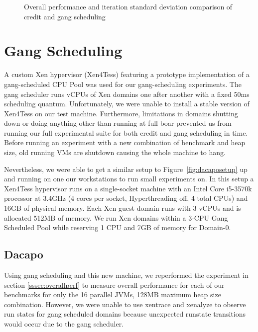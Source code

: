 \documentclass{sig-alternate}
\begin{document}

\begin{figure*}
\centering
{}
\caption{Overall performance and iteration standard deviation comparison of credit and gang scheduling}
\label{fig:gsresults}
\end{figure*}

\section{Gang Scheduling}
A custom Xen hypervisor (Xen4Tess) featuring a prototype implementation of a gang-scheduled CPU Pool was used for our gang-scheduling experiments. The gang scheduler runs vCPUs of Xen domains one after another with a fixed 50ms scheduling quantum. Unfortunately, we were unable to install a stable version of Xen4Tess on our test machine. Furthermore, limitations in domains shutting down or doing anything other than running at full-boar prevented us from running our full experimental suite for both credit and gang scheduling in time. Before running an experiment with a new combination of benchmark and heap size, old running VMs are shutdown causing the whole machine to hang.

Nevertheless, we were able to get a similar setup to Figure~\ref{fig:dacaposetup} up and running on one our workstations to run small experiments on. In this setup a Xen4Tess hypervisor runs on a single-socket machine with an Intel Core i5-3570k processor at 3.4GHz (4 cores per socket, Hyperthreading off,  4 total CPUs) and 16GB of physical memory. Each Xen guest domain runs with 3 vCPUs and is allocated 512MB of memory. We run Xen domains within a 3-CPU Gang Scheduled Pool while reserving 1 CPU and 7GB of memory for Domain-0.

\subsection{Dacapo}
Using gang scheduling and this new machine, we reperformed the experiment in section \ref{sssec:overallperf} to measure overall performance for each of our benchmarks for only the 16 parallel JVMs, 128MB maximum heap size combination. However, we were unable to use xentrace and xenalyze to observe run states for gang scheduled domains because unexpected runstate transitions would occur due to the gang scheduler.
\end{document}
